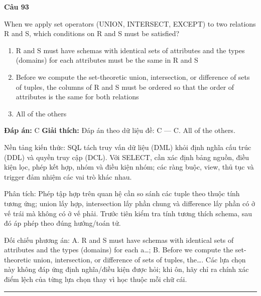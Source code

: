 \documentclass[11pt,a4paper]{article}
\newenvironment{question}[1]{%
  \par\vspace{1em}\noindent\textbf{\large Câu #1}\par\vspace{0.4em}
}{%
  \par\vspace{1em}\hrule\vspace{0.6em}
}
\newenvironment{choices}{%
  \begin{enumerate}[label=\textbf{\Alph*.},leftmargin=2.2em,itemsep=2pt,topsep=3pt]
}{%
  \end{enumerate}
}
\newcommand{\choice}{\item}
\begin{document}
\begin{question}{93}
When we apply set operators (UNION, INTERSECT, EXCEPT) to two relations R and S, which conditions on R and S must be satisfied?
\begin{choices}
\choice R and S must have schemas with identical sets of attributes and the types (domains) for each attributes must be the same in R and S
\choice Before we compute the set-theoretic union, intersection, or difference of sets of tuples, the columns of R and S must be ordered so that the order of attributes is the same for both relations
\choice All of the others
\end{choices}
\textbf{Đáp án:} C
\textbf{Giải thích:} Đáp án theo dữ liệu đề: C — C. All of the others.

Nền tảng kiến thức: SQL tách truy vấn dữ liệu (DML) khỏi định nghĩa cấu trúc (DDL) và quyền truy cập (DCL). Với SELECT, cần xác định bảng nguồn, điều kiện lọc, phép kết hợp, nhóm và điều kiện nhóm; các ràng buộc, view, thủ tục và trigger đảm nhiệm các vai trò khác nhau.

Phân tích: Phép tập hợp trên quan hệ cần so sánh các tuple theo thuộc tính tương ứng; union lấy hợp, intersection lấy phần chung và difference lấy phần có ở vế trái mà không có ở vế phải. Trước tiên kiểm tra tính tương thích schema, sau đó áp phép theo đúng hướng/toán tử.

Đối chiếu phương án: A. R and S must have schemas with identical sets of attributes and the types (domains) for each a…; B. Before we compute the set-theoretic union, intersection, or difference of sets of tuples, the…. Các lựa chọn này không đáp ứng định nghĩa/điều kiện được hỏi; khi ôn, hãy chỉ ra chính xác điểm lệch của từng lựa chọn thay vì học thuộc mỗi chữ cái.
\end{question}
\end{document}

